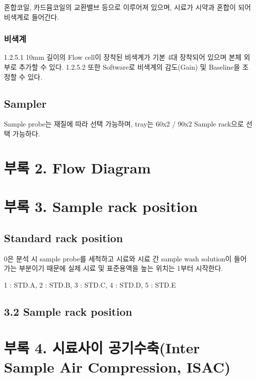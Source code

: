 \documentclass[
]{book}
\begin{document}
혼합코일, 카드뮴코일의 교환밸브 등으로 이루어져 있으며, 시료가 시약과 혼합이 되어 비색계로 들어간다.

\hypertarget{uxbe44uxc0c9uxacc4}{%
\subsubsection{비색계}\label{uxbe44uxc0c9uxacc4}}

1.2.5.1 10mm 길이의 Flow cell이 장착된 비색계가 기본 4대 장착되어 있으며 본체 외부로 추가할 수 있다.
1.2.5.2 또한 Software로 비색계의 감도(Gain) 및 Baseline을 조정할 수 있다.

\hypertarget{sampler}{%
\subsection{Sampler}\label{sampler}}

Sample probe는 재질에 따라 선택 가능하며, tray는 60x2 / 90x2 Sample rack으로 선택 가능하다.

\hypertarget{uxbd80uxb85d-2.-flow-diagram}{%
\section{부록 2. Flow Diagram}\label{uxbd80uxb85d-2.-flow-diagram}}

\hypertarget{uxbd80uxb85d-3.-sample-rack-position}{%
\section{부록 3. Sample rack position}\label{uxbd80uxb85d-3.-sample-rack-position}}

\hypertarget{standard-rack-position}{%
\subsection{Standard rack position}\label{standard-rack-position}}

0은 분석 시 sample probe를 세척하고 시료와 시료 간 sample wash solution이 들어가는 부분이기 때문에 실제 시료 및 표준용액을 높는 위치는 1부터 시작한다.

1 : STD.A, 2 : STD.B, 3 : STD.C, 4 : STD.D, 5 : STD.E

\hypertarget{sample-rack-position}{%
\subsection{3.2 Sample rack position}\label{sample-rack-position}}

\hypertarget{uxbd80uxb85d-4.-uxc2dcuxb8ccuxc0acuxc774-uxacf5uxae30uxc218uxcd95inter-sample-air-compression-isac}{%
\section{부록 4. 시료사이 공기수축(Inter Sample Air Compression, ISAC)}\label{uxbd80uxb85d-4.-uxc2dcuxb8ccuxc0acuxc774-uxacf5uxae30uxc218uxcd95inter-sample-air-compression-isac}}
\end{document}
